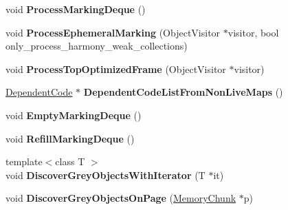 \begin{DoxyCompactItemize}
\item 
void {\bfseries Process\+Marking\+Deque} ()\hypertarget{classv8_1_1internal_1_1_mark_compact_collector_a57eef7a6331cd4e7a2054de8d463e203}{}\label{classv8_1_1internal_1_1_mark_compact_collector_a57eef7a6331cd4e7a2054de8d463e203}

\item 
void {\bfseries Process\+Ephemeral\+Marking} (Object\+Visitor $\ast$visitor, bool only\+\_\+process\+\_\+harmony\+\_\+weak\+\_\+collections)\hypertarget{classv8_1_1internal_1_1_mark_compact_collector_a628f60a4db0264977772b07050a3949f}{}\label{classv8_1_1internal_1_1_mark_compact_collector_a628f60a4db0264977772b07050a3949f}

\item 
void {\bfseries Process\+Top\+Optimized\+Frame} (Object\+Visitor $\ast$visitor)\hypertarget{classv8_1_1internal_1_1_mark_compact_collector_acaa03d06046b03fffb38edc44bbf66a2}{}\label{classv8_1_1internal_1_1_mark_compact_collector_acaa03d06046b03fffb38edc44bbf66a2}

\item 
\hyperlink{classv8_1_1internal_1_1_dependent_code}{Dependent\+Code} $\ast$ {\bfseries Dependent\+Code\+List\+From\+Non\+Live\+Maps} ()\hypertarget{classv8_1_1internal_1_1_mark_compact_collector_a4ce8425f156bf9a87cafa9e627d70b19}{}\label{classv8_1_1internal_1_1_mark_compact_collector_a4ce8425f156bf9a87cafa9e627d70b19}

\item 
void {\bfseries Empty\+Marking\+Deque} ()\hypertarget{classv8_1_1internal_1_1_mark_compact_collector_a3e533b3cfcb38c4339d17a903ad78a85}{}\label{classv8_1_1internal_1_1_mark_compact_collector_a3e533b3cfcb38c4339d17a903ad78a85}

\item 
void {\bfseries Refill\+Marking\+Deque} ()\hypertarget{classv8_1_1internal_1_1_mark_compact_collector_a5d10542489012efb0be47ea542fac563}{}\label{classv8_1_1internal_1_1_mark_compact_collector_a5d10542489012efb0be47ea542fac563}

\item 
{\footnotesize template$<$class T $>$ }\\void {\bfseries Discover\+Grey\+Objects\+With\+Iterator} (T $\ast$it)\hypertarget{classv8_1_1internal_1_1_mark_compact_collector_a23e6c321d6d68c404c7f862e9226e060}{}\label{classv8_1_1internal_1_1_mark_compact_collector_a23e6c321d6d68c404c7f862e9226e060}

\item 
void {\bfseries Discover\+Grey\+Objects\+On\+Page} (\hyperlink{classv8_1_1internal_1_1_memory_chunk}{Memory\+Chunk} $\ast$p)\hypertarget{classv8_1_1internal_1_1_mark_compact_collector_aa18b6b68538c0a2472a098af9e0e2131}{}\label{classv8_1_1internal_1_1_mark_compact_collector_aa18b6b68538c0a2472a098af9e0e2131}


\end{DoxyCompactItemize}
